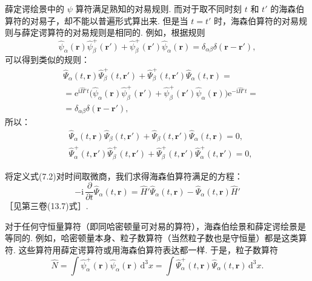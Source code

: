 薛定谔绘景中的 $\psi$ 算符满足熟知的对易规则. 而对于取不同时刻 $t$ 和 $t'$ 的海森伯算符的对易子，却不能以普遍形式算出来. 但是当 $t=t'$ 时，海森伯算符的对易规则与薛定谔算符的对易规则是相同的. 例如，根据规则
\begin{equation*}
\hat\psi_\alpha(\bm r)\hat\psi^{+}_\beta(\bm r')+\hat\psi^{+}_\beta(\bm r')\hat\psi_\alpha(\bm r)=\delta_{\alpha\beta}\delta(\bm r-\bm r'),
\end{equation*}
可以得到类似的规则：
\begin{equation}
\begin{aligned}
&\hat\Psi_\alpha(t,\bm r)\hat\Psi^{+}_\beta(t,\bm r')+\hat\Psi^{+}_\beta(t,\bm r')\hat\Psi_\alpha(t,\bm r)=\\
&=\mathrm{e}^{\mathrm{i}\hat H't}\big(\hat\psi_\alpha(\bm r)\hat\psi^{+}_\beta(\bm r')+\hat\psi^{+}_\beta(\bm r')\hat\psi_\alpha(\bm r)\big)\mathrm{e}^{-\mathrm{i}\hat H't}=\\
&=\delta_{\alpha\beta}\delta(\bm r-\bm r'),
\end{aligned}
\end{equation}
所以：
\begin{equation}
\begin{aligned}
&\hat\Psi_\alpha(t,\bm r)\hat\Psi_\beta(t,\bm r')+\hat\Psi_\beta(t,\bm r')\hat\Psi_\alpha(t,\bm r)=0,\\
&\hat\Psi^{+}_\alpha(t,\bm r')\hat\Psi^{+}_\beta(t,\bm r')+\hat\Psi^{+}_\beta(t,\bm r')\hat\Psi^{+}_\alpha(t,\bm r')=0,
\end{aligned}
\end{equation}

将定义式(7.2)对时间取微商，我们求得海森伯算符满足的方程：
\begin{equation}
-\mathrm{i}\,\frac{\partial}{\partial t}\hat\Psi_\alpha(t,\bm r)=\hat H'\hat\Psi_\alpha(t,\bm r)-\hat\Psi_\alpha(t,\bm r)\hat H'
\end{equation}
［见第三卷(13.7)式］.

对于任何守恒量算符（即同哈密顿量可对易的算符），海森伯绘景和薛定谔绘景是等同的. 例如，哈密顿量本身、粒子数算符（当然粒子数也是守恒量）都是这类算符. 这些算符用薛定谔算符或用海森伯算符表达都一样. 于是，粒子数算符
\begin{equation}
\hat N=\int\hat\psi^{+}_\alpha(\bm r)\hat\psi_\alpha(\bm r)\,\mathrm{d}^3x=\int\hat\Psi^{+}_\alpha(t,\bm r)\hat\Psi_\alpha(t,\bm r)\,\mathrm{d}^3x.
\end{equation}


